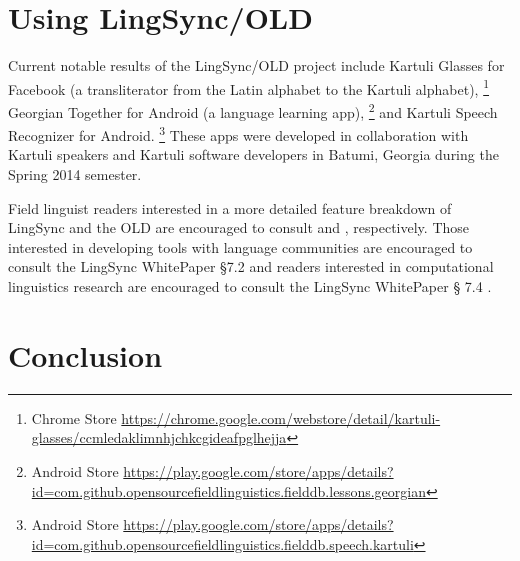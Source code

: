 \documentclass[11pt]{article}
\begin{document}
\section{Using LingSync/OLD}\label{open-data}



Current notable results of the LingSync/OLD project include Kartuli Glasses
for Facebook (a transliterator from the Latin alphabet to the Kartuli
alphabet),%
\footnote{Chrome Store
\url{https://chrome.google.com/webstore/detail/kartuli-glasses/ccmledaklimnhjchkcgideafpglhejja}} %
Georgian Together for Android (a language learning app),%
\footnote{Android Store
\url{https://play.google.com/store/apps/details?id=com.github.opensourcefieldlinguistics.fielddb.lessons.georgian}} %
and Kartuli Speech Recognizer for Android.%
\footnote{Android Store
\url{https://play.google.com/store/apps/details?id=com.github.opensourcefieldlinguistics.fielddb.speech.kartuli}} %
These apps were developed in collaboration with Kartuli speakers and Kartuli
software developers in Batumi, Georgia during the Spring 2014 semester.


Field linguist readers interested in a more detailed feature breakdown of
LingSync and the OLD are encouraged to consult \cite{lingsync:2012} and
\cite{dunham2014docs}, respectively. Those interested in developing tools
with language communities are encouraged to consult the LingSync WhitePaper
\S 7.2 \cite{LingSync:2012:WP} and readers interested in computational
linguistics research are encouraged to consult the LingSync WhitePaper \S
7.4 \cite{LingSync:2012:WP}.


\section{Conclusion}
\end{document}
